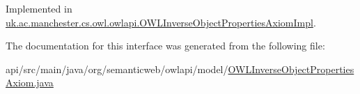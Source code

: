 Implemented in \hyperlink{classuk_1_1ac_1_1manchester_1_1cs_1_1owl_1_1owlapi_1_1_o_w_l_inverse_object_properties_axiom_impl_a00cf3c04b5d38d379ad9d97ae6e0029c}{uk.\-ac.\-manchester.\-cs.\-owl.\-owlapi.\-O\-W\-L\-Inverse\-Object\-Properties\-Axiom\-Impl}.



The documentation for this interface was generated from the following file\-:\begin{DoxyCompactItemize}
\item 
api/src/main/java/org/semanticweb/owlapi/model/\hyperlink{_o_w_l_inverse_object_properties_axiom_8java}{O\-W\-L\-Inverse\-Object\-Properties\-Axiom.\-java}\end{DoxyCompactItemize}
